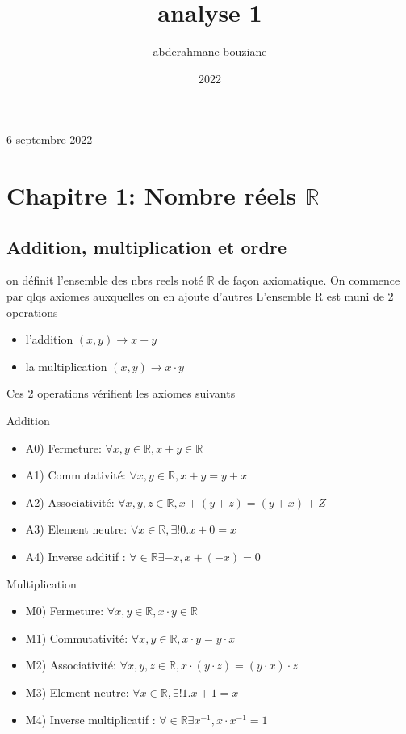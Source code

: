 \documentclass{article}
\title{analyse 1}
\author{abderahmane bouziane}
\date{2022}
\begin{document}
\maketitle

6 septembre 2022

\section{Chapitre 1: Nombre réels $\mathbb{R}$}

\subsection{Addition, multiplication et ordre}
on définit l'ensemble des nbrs reels noté $\mathbb{R}$ de façon axiomatique.
On commence par qlqs axiomes auxquelles on en ajoute d’autres
L'ensemble R est muni de 2 operations

\begin{itemize}
    \item l'addition $(x, y) \rightarrow x + y$
    \item la multiplication $(x, y) \rightarrow x \cdot y$
\end{itemize}

Ces 2 operations vérifient les axiomes suivants

Addition
\begin{itemize}
    \item A0) Fermeture: $\forall x, y \in \mathbb{R}, x + y \in \mathbb{R}$
    \item A1) Commutativité: $\forall x, y \in \mathbb{R}, x + y = y + x$
    \item A2) Associativité: $\forall x, y, z \in \mathbb{R}, x + (y + z) = (y + x) + Z$
    \item A3) Element neutre: $\forall x \in \mathbb{R}, \exists! 0. x + 0 = x$
    \item A4) Inverse additif : $\forall \in \mathbb{R} \exists -x, x + (-x) = 0$
\end{itemize}

Multiplication
\begin{itemize}
    \item M0) Fermeture: $\forall x, y \in \mathbb{R}, x \cdot y \in \mathbb{R}$
    \item M1) Commutativité: $\forall x, y \in \mathbb{R}, x \cdot y = y \cdot x$
    \item M2) Associativité: $\forall x, y, z \in \mathbb{R}, x \cdot (y \cdot z) = (y \cdot x) \cdot z$
    \item M3) Element neutre: $\forall x \in \mathbb{R}, \exists! 1. x + 1 = x$
    \item M4) Inverse multiplicatif : $\forall \in \mathbb{R} \exists x^{-1}, x \cdot x^{-1} = 1$
\end{itemize}
\end{document}
